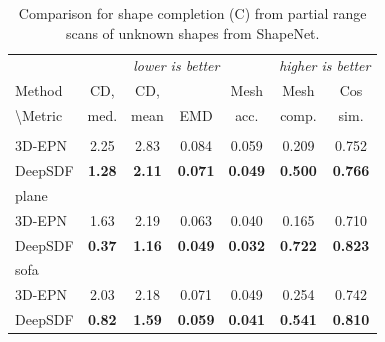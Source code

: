 \begin{table}[t]
\centering
\footnotesize
\begin{tabular}{|l|c|c|c|c||c|c|}
\hline
 & \multicolumn{4}{c||}{\footnotesize \textit{lower is better}} & \multicolumn{2}{c|}{\footnotesize \textit{higher is better}} \\
Method                  & CD, &  CD,        &    &     Mesh & Mesh & Cos \\
 \textbackslash Metric & med. & mean & EMD & acc. & comp. &  sim.\\
\hhline{|=|=|=|=|=||=|=|} \hline
\multicolumn{7}{|l|}{chair} \\ \hline
3D-EPN   & 2.25 & 2.83  & 0.084 & 0.059 & 0.209 & 0.752\\
DeepSDF  & \bf{1.28} & \bf{2.11}   & \bf{0.071} & \bf{0.049} & \bf{0.500} & \bf{0.766} \\ \hline
\multicolumn{7}{|l|}{plane} \\ \hline
3D-EPN   & 1.63  & 2.19 & 0.063 & 0.040 & 0.165 & 0.710\\
DeepSDF & \bf{0.37} & \bf{1.16} & \bf{0.049} & \bf{0.032} & \bf{0.722} & \bf{0.823} \\ \hline
\multicolumn{7}{|l|}{sofa} \\ \hline
3D-EPN   & 2.03  & 2.18 & 0.071 & 0.049 & 0.254 & 0.742\\
DeepSDF & \bf{0.82} & \bf{1.59} & \bf{0.059} & \bf{0.041} & \bf{0.541} & \bf{0.810} \\ \hline
\end{tabular}
\caption{Comparison for shape completion (C) from partial range scans of unknown shapes from ShapeNet.}
\label{tab:5}
\end{table}